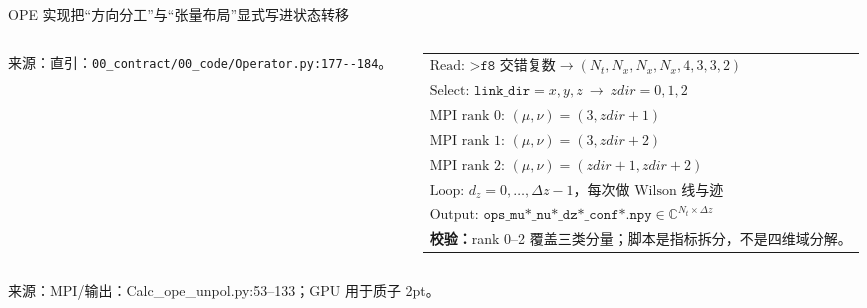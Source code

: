 \documentclass[UTF8,aspectratio=169,11pt]{ctexbeamer}
\newcommand{\source}[1]{%
  \vspace{0.08em}\par{\raggedright\scriptsize\color{muted}来源：#1\par}}
\newcommand{\codepath}[1]{\nolinkurl{#1}}
\begin{document}
\begin{frame}[t]{OPE 实现把“方向分工”与“张量布局”显式写进状态转移}
  \begin{columns}[T,totalwidth=\textwidth]
    \begin{column}{0.43\textwidth}
      
      \source{直引：\codepath{00_contract/00_code/Operator.py:177--184}。}
    \end{column}
    \begin{column}{0.51\textwidth}
      \small
      \begin{tabularx}{0.98\linewidth}{@{}>{\raggedright\arraybackslash}X@{}}
        $\text{Read: }\texttt{>f8}\text{ 交错复数}\to(N_t,N_x,N_x,N_x,4,3,3,2)$ \\
        $\text{Select: }\texttt{link\_dir}=x,y,z\ \to\ zdir=0,1,2$ \\
        $\text{MPI rank 0: }(\mu,\nu)=(3,zdir+1)$ \\
        $\text{MPI rank 1: }(\mu,\nu)=(3,zdir+2)$ \\
        $\text{MPI rank 2: }(\mu,\nu)=(zdir+1,zdir+2)$ \\
        $\text{Loop: }d_z=0,\ldots,\Delta z-1\text{，每次做 Wilson 线与迹}$ \\
        $\text{Output: }\texttt{ops\_mu*\_nu*\_dz*\_conf*.npy}\in\mathbb C^{N_t\times\Delta z}$ \\
        \textbf{校验：}rank 0--2 覆盖三类分量；脚本是指标拆分，不是四维域分解。
      \end{tabularx}
    \end{column}
  \end{columns}
  \source{MPI/输出：Calc\_ope\_unpol.py:53--133；GPU 用于质子 2pt。}
\end{frame}
\end{document}

